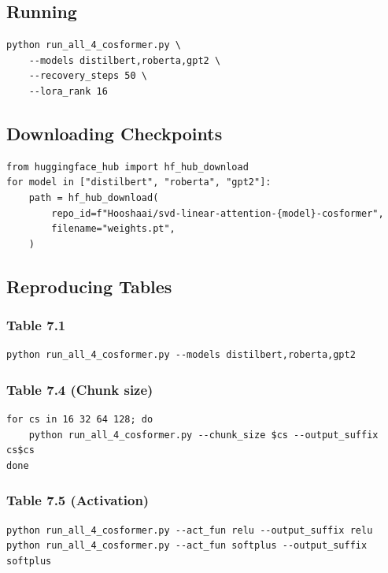 \subsection{Running}

\begin{lstlisting}
python run_all_4_cosformer.py \
    --models distilbert,roberta,gpt2 \
    --recovery_steps 50 \
    --lora_rank 16
\end{lstlisting}

\subsection{Downloading Checkpoints}

\begin{lstlisting}
from huggingface_hub import hf_hub_download
for model in ["distilbert", "roberta", "gpt2"]:
    path = hf_hub_download(
        repo_id=f"Hooshaai/svd-linear-attention-{model}-cosformer",
        filename="weights.pt",
    )
\end{lstlisting}

\subsection{Reproducing Tables}

\subsubsection{Table 7.1}

\begin{lstlisting}
python run_all_4_cosformer.py --models distilbert,roberta,gpt2
\end{lstlisting}

\subsubsection{Table 7.4 (Chunk size)}

\begin{lstlisting}
for cs in 16 32 64 128; do
    python run_all_4_cosformer.py --chunk_size $cs --output_suffix cs$cs
done
\end{lstlisting}

\subsubsection{Table 7.5 (Activation)}

\begin{lstlisting}
python run_all_4_cosformer.py --act_fun relu --output_suffix relu
python run_all_4_cosformer.py --act_fun softplus --output_suffix softplus
\end{lstlisting}

